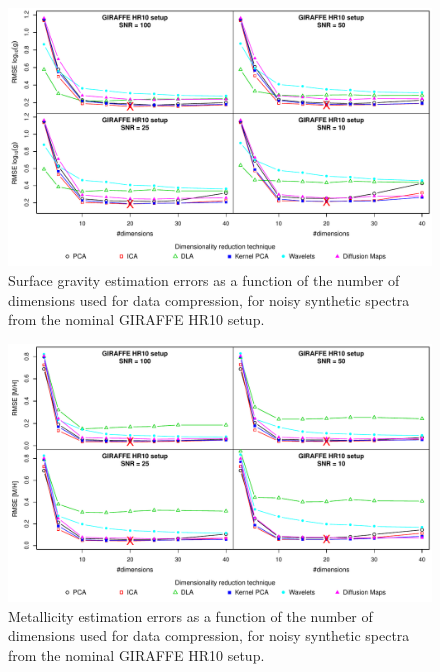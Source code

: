 \documentclass[a4paper,fleqn,usenatbib]{mnras}
\begin{document}
{{{\begin{figure}
\centering\includegraphics[width=\textwidth]{flamesHR10_Logg_BestSVM_N-RMSE_test.pdf}
\caption{Surface gravity estimation errors as a function of the number of
  dimensions used for data compression, for noisy synthetic
  spectra from the nominal GIRAFFE HR10 setup.}
\label{fig:04}
\end{figure}

\begin{figure}
\centering\includegraphics[width=\textwidth]{flamesHR10_Meta_BestSVM_N-RMSE_test.pdf}
\caption{Metallicity estimation errors as a function of the number of
  dimensions used for data compression, for noisy synthetic
  spectra from the nominal GIRAFFE HR10 setup.}
\label{fig:06}
\end{figure}

}}}
\end{document}
